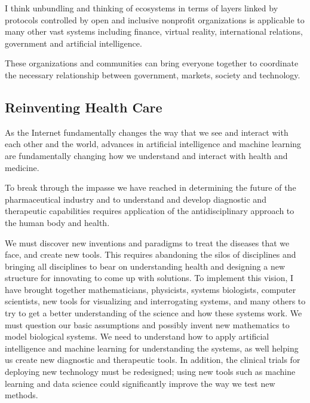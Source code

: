 I think unbundling and thinking of ecosystems in terms of layers linked by protocols controlled by open and inclusive nonprofit organizations is  applicable to many other vast systems including finance, virtual reality, international relations, government and artificial intelligence.

These organizations and communities can bring everyone together to coordinate the necessary relationship between government, markets, society and technology.

\subsection{Reinventing Health Care}
\label{theoryhealth}

As the Internet fundamentally changes the way that we see and interact with each other and the world, advances in artificial intelligence and machine learning are fundamentally changing how we understand and interact with health and medicine.

To break through the impasse we have reached in determining the future of the pharmaceutical industry and to understand and develop diagnostic and therapeutic capabilities requires application of the antidisciplinary approach to the human body and health.

We must discover new inventions and paradigms to treat the diseases that we face, and create new tools. This requires abandoning the silos of disciplines and bringing all disciplines to bear on understanding health and designing a new structure for innovating to come up with solutions. To implement this vision, I have brought together mathematicians, physicists, systems biologists, computer scientists, new tools for visualizing and interrogating systems, and many others to try to get a better understanding of the science and how these systems work. We must question our basic assumptions and possibly invent new mathematics to model biological systems. We need to understand how to apply artificial intelligence and machine learning for understanding the systems, as well helping us create new diagnostic and therapeutic tools. In addition, the clinical trials for deploying new technology must be redesigned; using new tools such as machine learning and data science could significantly improve the way we test new methods. 

